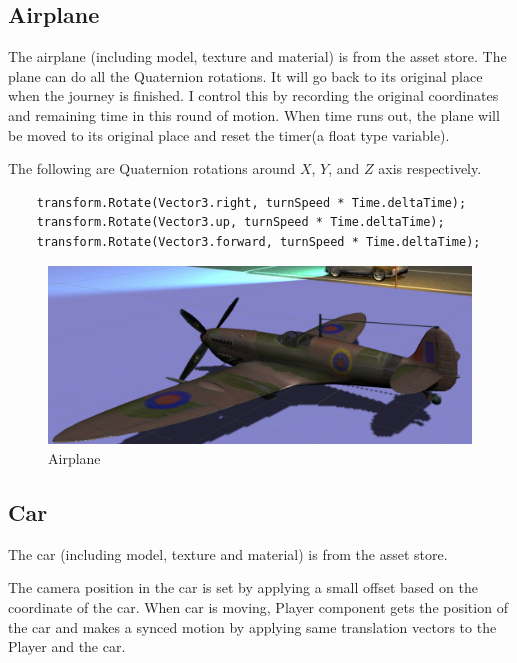 \documentclass[11pt]{article}
\begin{document}
	
	\subsection{Airplane}
	The airplane (including model, texture and material) is from the asset store\cite{planeassets}.
	The plane can do all the Quaternion rotations. It will go back to its original place when the journey is finished. I control this by recording the original coordinates and remaining time in this round of motion. When time runs out, the plane will be moved to its original place and reset the timer(a float type variable).
	
	The following are Quaternion rotations around $X$, $Y$, and $Z$ axis respectively.
	\begin{lstlisting}
	transform.Rotate(Vector3.right, turnSpeed * Time.deltaTime);
	transform.Rotate(Vector3.up, turnSpeed * Time.deltaTime);
	transform.Rotate(Vector3.forward, turnSpeed * Time.deltaTime);\end{lstlisting}
	
	\begin{figure}[htbp]
		\centering
		\includegraphics[width=.90\textwidth]{fig/plane.png}
		\caption{Airplane}
	\end{figure}
	
	\subsection{Car}
	The car (including model, texture and material) is from the asset store\cite{carassets}.
	
	The camera position in the car is set by applying a small offset based on the coordinate of the car. When car is moving, Player component gets the position of the car and makes a synced motion by applying same translation vectors to the Player and the car.
	
\end{document}
